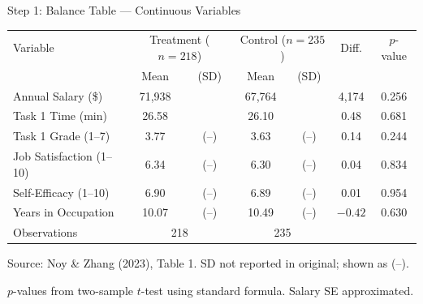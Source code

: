 \documentclass[hyperref={pdfpagelabels=false}]{beamer}
\begin{document}
	\begin{frame}{Step 1: Balance Table --- Continuous Variables}
		\begin{center}
			\begin{threeparttable}
				\linespread{1}
				\fontsize{8}{8pt}\selectfont
				\centering
				\begin{tabular}{@{}lcccccc@{}}
					\toprule
					Variable & \multicolumn{2}{c}{Treatment ($n=218$)} & \multicolumn{2}{c}{Control ($n=235$)} & Diff. & $p$-value \\
					& Mean & (SD) & Mean & (SD) & & \\
					\midrule\midrule
					Annual Salary (\$) & 71,938 & & 67,764 & & 4,174 & 0.256 \\
					Task 1 Time (min) & 26.58 & & 26.10 & & 0.48 & 0.681 \\
					Task 1 Grade (1--7) & 3.77 & (--) & 3.63 & (--) & 0.14 & 0.244 \\
					Job Satisfaction (1--10) & 6.34 & (--) & 6.30 & (--) & 0.04 & 0.834 \\
					Self-Efficacy (1--10) & 6.90 & (--) & 6.89 & (--) & 0.01 & 0.954 \\
					Years in Occupation & 10.07 & (--) & 10.49 & (--) & $-0.42$ & 0.630 \\
					\midrule\midrule
					Observations & \multicolumn{2}{c}{218} & \multicolumn{2}{c}{235} & & \\
					\bottomrule
				\end{tabular}
				\begin{tablenotes}
					\fontsize{7}{7pt}\selectfont
					\item Source: Noy \& Zhang (2023), Table 1. SD not reported in original; shown as (--).
					\item $p$-values from two-sample $t$-test using standard formula. Salary SE approximated.
				\end{tablenotes}
			\end{threeparttable}
		\end{center}
	\end{frame}
	
\end{document}
